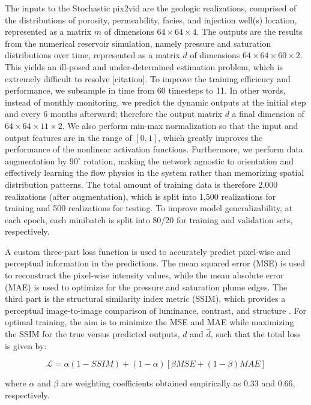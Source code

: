 \documentclass[10pt, twoside]{article}
\begin{document}
The inputs to the Stochastic pix2vid are the geologic realizations, comprised of the distributions of porosity, permeability, facies, and injection well(s) location, represented as a matrix $m$ of dimensions $64\times64\times4$. The outputs are the results from the numerical reservoir simulation, namely pressure and saturation distributions over time, represented as a matrix $d$ of dimensions $64\times64\times60\times2$. This yields an ill-posed and under-determined estimation problem, which is extremely difficult to resolve [citation]. To improve the training efficiency and performance, we subsample in time from 60 timesteps to 11. In other words, instead of monthly monitoring, we predict the dynamic outputs at the initial step and every 6 months afterward; therefore the output matrix $d$ a final dimension of $64\times64\times11\times2$. We also perform min-max normalization so that the input and output features are in the range of $[0,1]$, which greatly improves the performance of the nonlinear activation functions. Furthermore, we perform data augmentation by $90^{\circ}$ rotation, making the network agnostic to orientation and effectively learning the flow physics in the system rather than memorizing spatial distribution patterns. The total amount of training data is therefore 2,000 realizations (after augmentation), which is split into 1,500 realizations for training and 500 realizations for testing. To improve model generalizability, at each epoch, each minibatch is split into 80/20 for training and validation sets, respectively. 

A custom three-part loss function is used to accurately predict pixel-wise and perceptual information in the predictions. The mean squared error (MSE) is used to reconstruct the pixel-wise intensity values, while the mean absolute error (MAE) is used to optimize for the pressure and saturation plume edges. The third part is the structural similarity index metric (SSIM), which provides a perceptual image-to-image comparison of luminance, contrast, and structure \cite{Bovik2004}. For optimal training, the aim is to minimize the MSE and MAE while maximizing the SSIM for the true versus predicted outputs, $d$ and $\hat{d}$, such that the total loss is given by:

\begin{equation} \label{eq7}
    \mathcal{L} = \alpha(1-SSIM) + (1-\alpha)[\beta MSE + (1-\beta) MAE]
\end{equation}

where $\alpha$ and $\beta$ are weighting coefficients obtained empirically as 0.33 and 0.66, respectively.
\end{document}

